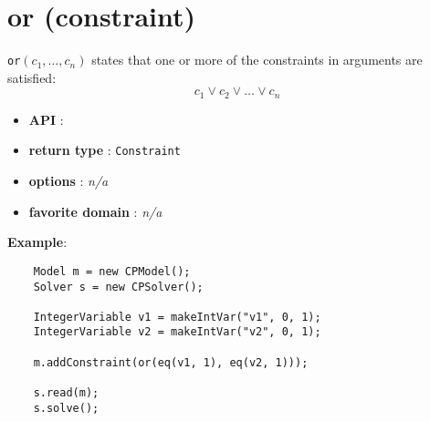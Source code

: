 \label{or}
\hypertarget{or}{}

\section{or (constraint)}\label{or:orconstraint}\hypertarget{or:orconstraint}{}
\begin{notedef}
  \texttt{or}$(c_1,\ldots,c_n)$ states that one or more of the constraints in arguments are satisfied:
$$ c_1 \lor c_2 \lor\ldots\lor c_n$$
\end{notedef}

\begin{itemize}
	\item \textbf{API} : 
	\item \textbf{return type} : \texttt{Constraint}
	\item \textbf{options} : \emph{n/a}
	\item \textbf{favorite domain} : \emph{n/a}
\end{itemize}

\textbf{Example}:
\begin{lstlisting}
	Model m = new CPModel();
	Solver s = new CPSolver();
	
	IntegerVariable v1 = makeIntVar("v1", 0, 1);
	IntegerVariable v2 = makeIntVar("v2", 0, 1);
	
	m.addConstraint(or(eq(v1, 1), eq(v2, 1)));
	
	s.read(m);
	s.solve();
\end{lstlisting}
